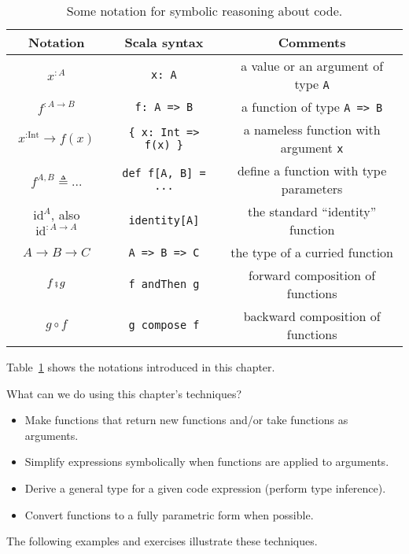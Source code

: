 \begin{table}
\begin{centering}
\begin{tabular}{|c|c|c|}
\hline 
\textbf{\small{}Notation} & \textbf{\small{}Scala syntax} & \textbf{\small{}Comments}\tabularnewline
\hline 
\hline 
{\small{}$x^{:A}$} & {\small{}}\lstinline!x: A! & {\small{}a value or an argument of type }\lstinline!A!\tabularnewline
\hline 
{\small{}$f^{:A\rightarrow B}$} & {\small{}}\lstinline!f: A => B! & {\small{}a function of type }\lstinline!A => B!\tabularnewline
\hline 
{\small{}$x^{:\text{Int}}\rightarrow f(x)$} & {\small{}}\lstinline!{ x: Int => f(x) }! & {\small{}a nameless function with argument }\lstinline!x!\tabularnewline
\hline 
{\small{}$f^{A,B}\triangleq...$} & {\small{}}\lstinline!def f[A, B] = ...! & {\small{}define a function with type parameters}\tabularnewline
\hline 
{\small{}$\text{id}^{A}$, also $\text{id}^{:A\rightarrow A}$} & {\small{}}\lstinline!identity[A]! & {\small{}the standard \textsf{``}identity\textsf{''} function}\tabularnewline
\hline 
{\small{}$A\rightarrow B\rightarrow C$} & {\small{}}\lstinline!A => B => C! & {\small{}the type of a curried function}\tabularnewline
\hline 
{\small{}$f\bef g$} & {\small{}}\lstinline!f andThen g! & {\small{}forward composition of functions}\tabularnewline
\hline 
{\small{}$g\circ f$} & {\small{}}\lstinline!g compose f! & {\small{}backward composition of functions}\tabularnewline
\hline 
\end{tabular}
\par\end{centering}
\caption{Some notation for symbolic reasoning about code.\label{tab:Mathematical-notation-for-code}}
\end{table}
Table~\ref{tab:Mathematical-notation-for-code} shows the notations
introduced in this chapter. 

What can we do using this chapter\textsf{'}s techniques?
\begin{itemize}
\item Make functions that return new functions and/or take functions as
arguments.
\item Simplify expressions symbolically when functions are applied to arguments.
\item Derive a general type for a given code expression (perform type inference).
\item Convert functions to a fully parametric form when possible.
\end{itemize}
The following examples and exercises illustrate these techniques.

